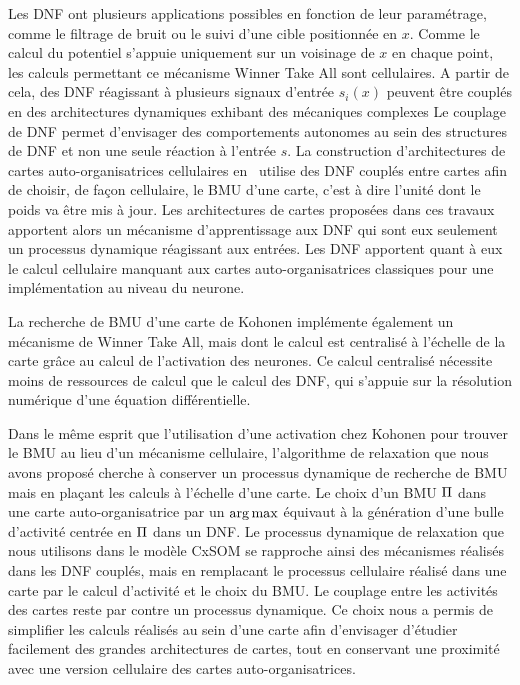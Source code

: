 \documentclass[../main]{subfiles}
\begin{document}
Les DNF ont plusieurs applications possibles en fonction de leur paramétrage, comme le filtrage de bruit ou le suivi d'une cible positionnée en $x$.
Comme le calcul du potentiel s'appuie uniquement sur un voisinage de $x$ en chaque point, les calculs permettant ce mécanisme Winner Take All sont cellulaires.
A partir de cela, des DNF réagissant à plusieurs signaux d'entrée $s_i(x)$ peuvent être couplés en des architectures dynamiques exhibant des mécaniques complexes \cite{Fix2011ADN, Sandamirskaya2014DynamicNF}
Le couplage de DNF permet d'envisager des comportements autonomes au sein des structures de DNF et non une seule réaction à l'entrée $s$. 
La construction d'architectures de cartes auto-organisatrices cellulaires en~\cite{khouzam_neural_2014,menard05} utilise des DNF couplés entre cartes afin de choisir, de façon cellulaire, le BMU d'une carte, c'est à dire l'unité dont le poids va être mis à jour.
Les architectures de cartes proposées dans ces travaux apportent alors un mécanisme d'apprentissage aux DNF qui sont eux seulement un processus dynamique réagissant aux entrées. Les DNF apportent quant à eux le calcul cellulaire manquant aux cartes auto-organisatrices classiques pour une implémentation au niveau du neurone.

La recherche de BMU d'une carte de Kohonen implémente également un mécanisme de Winner Take All, mais dont le calcul est centralisé à l'échelle de la carte grâce au calcul de l'activation des neurones.
Ce calcul centralisé nécessite moins de ressources de calcul que le calcul des DNF, qui s'appuie sur la résolution numérique d'une équation différentielle.

Dans le même esprit que l'utilisation d'une activation chez Kohonen pour trouver le BMU au lieu d'un mécanisme cellulaire, l'algorithme de relaxation que nous avons proposé cherche à conserver un processus dynamique de recherche de BMU mais en plaçant les calculs à l'échelle d'une carte. 
Le choix d'un BMU $\Pi$ dans une carte auto-organisatrice par un $\operatorname*{arg\,max}$ équivaut à la génération d'une bulle d'activité centrée en $\Pi$ dans un DNF. 
Le processus dynamique de relaxation que nous utilisons dans le modèle CxSOM se rapproche ainsi des mécanismes réalisés dans les DNF couplés, mais en remplacant le processus cellulaire réalisé dans une carte par le calcul d'activité et le choix du BMU. Le couplage entre les activités des cartes reste par contre un processus dynamique.
Ce choix nous a permis de simplifier les calculs réalisés au sein d'une carte afin d'envisager d'étudier facilement des grandes architectures de cartes, tout en conservant une proximité avec une version cellulaire des cartes auto-organisatrices.
\end{document}
